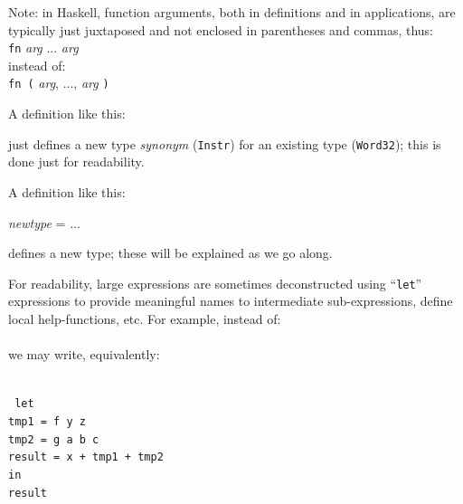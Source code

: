 \documentclass[11pt]{article}
\newcommand{\hmm}{\hspace*{2em}}
\newcommand{\hmmm}{\hspace*{3em}}
\newcommand{\hmmmm}{\hspace*{4em}}
\begin{document}
Note: in Haskell, function arguments, both in definitions
and in applications, are typically just juxtaposed and not enclosed in
parentheses and commas, thus: \\
\hspace*{2in} {\tt fn} \emph{arg} ... \emph{arg} \\
instead of: \\
\hspace*{2in} {\tt fn (} \emph{arg}, ..., \emph{arg} {\tt )}

A definition like this:

\hmmm {\tt type Instr = Word32}

just defines a new type \emph{synonym} ({\tt Instr}) for an existing type ({\tt Word32});
this is done just for readability.

A definition like this:

\hmmm {\tt data} \emph{newtype} = ...

defines a new type; these will be explained as we go along.

For readability, large expressions are sometimes deconstructed using
``{\tt let}'' expressions to provide meaningful names to intermediate
sub-expressions, define local help-functions, etc. For example,
instead of: \\
\hmmmm{\tt x + f y z - g a b c} \\
we may write, equivalently: \\
\hmmmm \
\begin{minipage}[t]{4in}\tt
let \\
\hmm tmp1 = f y z \\
\hmm tmp2 = g a b c \\
\hmm result = x + tmp1 + tmp2 \\
in \\
\hmm result
\end{minipage}
\end{document}
